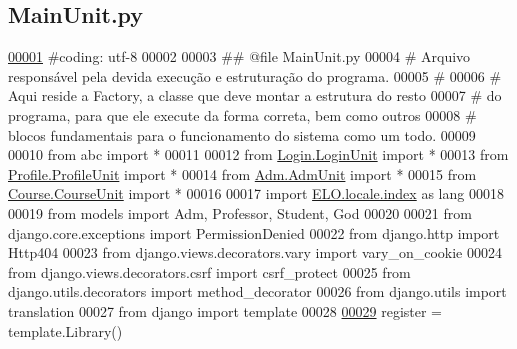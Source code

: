 \hypertarget{MainUnit_8py_source}{}\subsection{Main\+Unit.\+py}
\label{MainUnit_8py_source}

\begin{DoxyCode}
\hypertarget{MainUnit_8py_source_l00001}{}\hyperlink{namespaceELO_1_1MainUnit}{00001} \textcolor{comment}{#coding: utf-8}
00002 
00003 \textcolor{comment}{## @file MainUnit.py}
00004 \textcolor{comment}{#   Arquivo responsável pela devida execução e estruturação do programa.}
00005 \textcolor{comment}{#}
00006 \textcolor{comment}{#   Aqui reside a Factory, a classe que deve montar a estrutura do resto}
00007 \textcolor{comment}{#   do programa, para que ele execute da forma correta, bem como outros}
00008 \textcolor{comment}{#   blocos fundamentais para o funcionamento do sistema como um todo.}
00009 
00010 \textcolor{keyword}{from} abc \textcolor{keyword}{import} *
00011 
00012 \textcolor{keyword}{from} \hyperlink{namespaceLogin_1_1LoginUnit}{Login.LoginUnit} \textcolor{keyword}{import} *
00013 \textcolor{keyword}{from} \hyperlink{namespaceProfile_1_1ProfileUnit}{Profile.ProfileUnit} \textcolor{keyword}{import} *
00014 \textcolor{keyword}{from} \hyperlink{namespaceAdm_1_1AdmUnit}{Adm.AdmUnit} \textcolor{keyword}{import} *
00015 \textcolor{keyword}{from} \hyperlink{namespaceCourse_1_1CourseUnit}{Course.CourseUnit} \textcolor{keyword}{import} *
00016 
00017 \textcolor{keyword}{import} \hyperlink{namespaceELO_1_1locale_1_1index}{ELO.locale.index} \textcolor{keyword}{as} lang
00018 
00019 \textcolor{keyword}{from} models \textcolor{keyword}{import} Adm, Professor, Student, God
00020 
00021 \textcolor{keyword}{from} django.core.exceptions \textcolor{keyword}{import} PermissionDenied
00022 \textcolor{keyword}{from} django.http \textcolor{keyword}{import} Http404
00023 \textcolor{keyword}{from} django.views.decorators.vary \textcolor{keyword}{import} vary\_on\_cookie
00024 \textcolor{keyword}{from} django.views.decorators.csrf \textcolor{keyword}{import} csrf\_protect
00025 \textcolor{keyword}{from} django.utils.decorators \textcolor{keyword}{import} method\_decorator
00026 \textcolor{keyword}{from} django.utils \textcolor{keyword}{import} translation
00027 \textcolor{keyword}{from} django \textcolor{keyword}{import} template
00028 
\hypertarget{MainUnit_8py_source_l00029}{}\hyperlink{namespaceELO_1_1MainUnit_ac11441626deff8b14faad131d56cc790}{00029} register = template.Library()

\end{DoxyCode}
